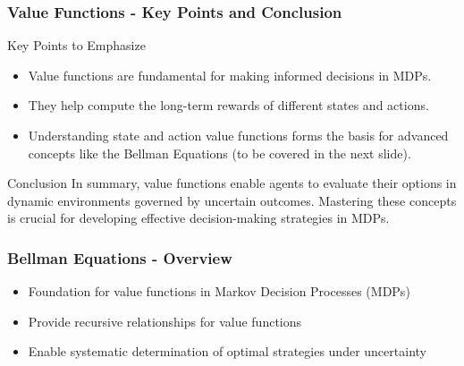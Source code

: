 \documentclass[aspectratio=169]{beamer}
\begin{document}
\begin{frame}[fragile]
    \frametitle{Value Functions - Key Points and Conclusion}
    \begin{block}{Key Points to Emphasize}
        \begin{itemize}
            \item Value functions are fundamental for making informed decisions in MDPs.
            \item They help compute the long-term rewards of different states and actions.
            \item Understanding state and action value functions forms the basis for advanced concepts like the Bellman Equations (to be covered in the next slide).
        \end{itemize}
    \end{block}

    \begin{block}{Conclusion}
        In summary, value functions enable agents to evaluate their options in dynamic environments governed by uncertain outcomes. 
        Mastering these concepts is crucial for developing effective decision-making strategies in MDPs.
    \end{block}
\end{frame}

\begin{frame}[fragile]
  \frametitle{Bellman Equations - Overview}
  \begin{itemize}
    \item Foundation for value functions in Markov Decision Processes (MDPs)
    \item Provide recursive relationships for value functions
    \item Enable systematic determination of optimal strategies under uncertainty
  \end{itemize}
\end{frame}
\end{document}
